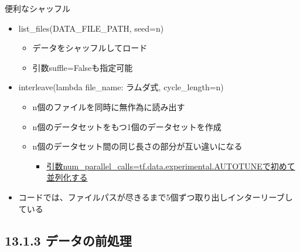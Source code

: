 \documentclass[aspectratio=169, dvipdfmx, 14pt, xcolor={svgnames,dvipsnames}, t]{beamer}
\begin{document}
\begin{frame}{便利なシャッフル}

  \begin{itemize}
    \tightlist
    \item
          list\_files(DATA\_FILE\_PATH, seed=n)

          \begin{itemize}
            \tightlist
            \item
                  データをシャッフルしてロード
            \item
                  引数suffle=Falseも指定可能
          \end{itemize}
    \item
          interleave(lambda file\_name: ラムダ式, cycle\_length=n)

          \begin{itemize}
            \tightlist
            \item
                  n個のファイルを同時に無作為に読み出す
            \item
                  n個のデータセットをもつ1個のデータセットを作成
            \item
                  n個のデータセット間の同じ長さの部分が互い違いになる

                  \begin{itemize}
                    \tightlist
                    \item
                          \href{https://tensorflow.classcat.com/2019/03/23/tf20-alpha-guide-data-performance/}{引数num\_parallel\_calls=tf.data.experimental.AUTOTUNEで初めて並列化する}
                  \end{itemize}
          \end{itemize}
    \item
          コードでは、ファイルパスが尽きるまで5個ずつ取り出しインターリーブしている
  \end{itemize}

\end{frame}


\hypertarget{ux30c7ux30fcux30bfux306eux524dux51e6ux7406}{%
  \subsection{13.1.3 データの前処理}\label{ux30c7ux30fcux30bfux306eux524dux51e6ux7406}}

\end{document}
